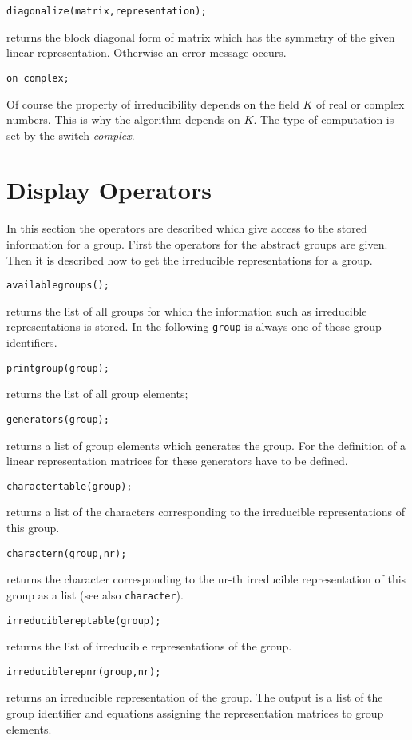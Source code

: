 {\tt diagonalize(matrix,representation);}

returns the block diagonal form of matrix which has the symmetry
of the given linear representation. Otherwise an error message occurs.

{\tt on complex;}

Of course the property of irreducibility depends on the field $K$ of
real or complex numbers. This is why the algorithm depends on $K$.
The type of computation is set by the switch {\em complex}.

\section{Display Operators}

In this section the operators are described which give access to the
stored information for a group.
First the operators for the abstract groups are given.
Then it is described how to get the irreducible representations
for a group.

{\tt availablegroups();}

returns the list of all groups for which the information such as
irreducible representations is stored. In the following {\tt group}
is always one of these group identifiers.

{\tt printgroup(group);}

returns the list of all group elements;

{\tt generators(group);}

returns a list of group elements which generates the group. For the
definition of a linear representation matrices for these generators
have to be defined.

{\tt charactertable(group);}

returns a list of the characters corresponding to the irreducible
representations of this group.

{\tt charactern(group,nr);}

returns the character corresponding to the nr-th irreducible representation
of this group as a list (see also {\tt character}).

{\tt irreduciblereptable(group);}

returns the list of irreducible representations of the group.

{\tt irreduciblerepnr(group,nr);}

returns an irreducible representation of the group. The output
is a list of the group identifier and equations
assigning the representation matrices to group elements.

